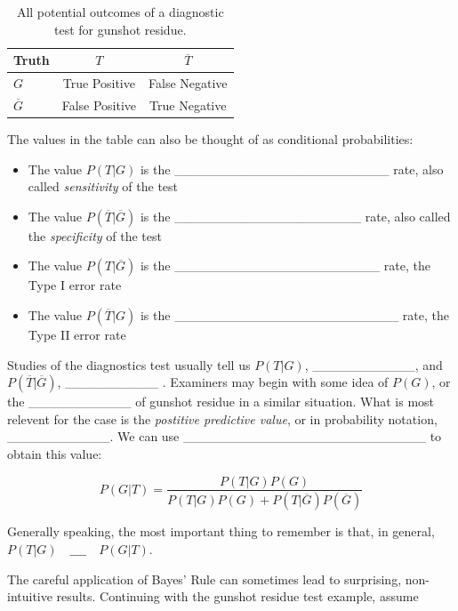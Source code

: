 \documentclass[]{book}
\providecommand{\tightlist}{%
  \setlength{\itemsep}{0pt}\setlength{\parskip}{0pt}}
\theoremstyle{definition}
\theoremstyle{definition}
\theoremstyle{remark}
\begin{document}
\begin{table}[h]
\centering
\begin{tabular}{|l|c|c|}
\hline
Truth & $T$ & $\overline{T}$ \\
\hline
$G$ & True Positive & False Negative \\
\hline
$\overline{G}$ & False Positive & True Negative \\
\hline
\end{tabular}
\caption{\label{tab:bayesex} All potential outcomes of a diagnostic test for gunshot residue.}
\end{table}

The values in the table can also be thought of as conditional
probabilities:

\begin{itemize}
\tightlist
\item
  The value \(P(T|G)\) is the
  \_\_\_\_\_\_\_\_\_\_\_\_\_\_\_\_\_\_\_\_\_\_\_ rate, also called
  \emph{sensitivity} of the test \vspace{.1in}
\item
  The value \(P(\overline{T}|\overline{G})\) is the
  \_\_\_\_\_\_\_\_\_\_\_\_\_\_\_\_\_\_\_\_ rate, also called the
  \emph{specificity} of the test \vspace{.1in}
\item
  The value \(P(T|\overline{G})\) is the
  \_\_\_\_\_\_\_\_\_\_\_\_\_\_\_\_\_\_\_\_\_\_ rate, the Type I error
  rate \vspace{.1in}
\item
  The value \(P(\overline{T}|G)\) is the
  \_\_\_\_\_\_\_\_\_\_\_\_\_\_\_\_\_\_\_\_\_\_\_\_ rate, the Type II
  error rate
\end{itemize}

Studies of the diagnostics test usually tell us \(P(T|G)\),
\_\_\_\_\_\_\_\_\_\_\_, and \(P(\overline{T}|\overline{G})\),
\_\_\_\_\_\_\_\_\_\_ . Examiners may begin with some idea of \(P(G)\),
or the \_\_\_\_\_\_\_\_\_\_\_ of gunshot residue in a similar situation.
What is most relevent for the case is the \emph{postitive predictive
value}, or in probability notation, \_\_\_\_\_\_\_\_\_\_\_. We can use
\_\_\_\_\_\_\_\_\_\_\_\_\_\_\_\_\_\_\_\_\_\_\_\_\_\_ to obtain this
value:

\[ P(G|T) = \frac{P(T|G)P(G)}{P(T|G)P(G) + P(T|\overline{G})P(\overline{G})}\]

Generally speaking, the most important thing to remember is that, in
general, \(P(T|G) \quad \_\_\_\_ \quad P(G|T)\).

The careful application of Bayes' Rule can sometimes lead to surprising,
non-intuitive results. Continuing with the gunshot residue test example,
assume
\end{document}
